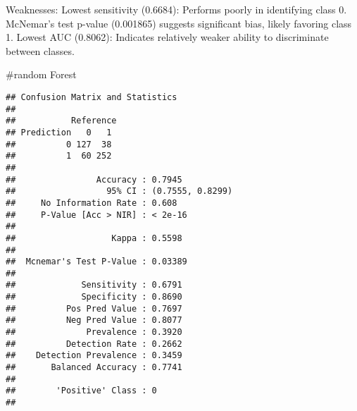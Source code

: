 \documentclass[
]{article}
\newenvironment{Shaded}{\begin{snugshade}}{\end{snugshade}}
\newcommand{\AttributeTok}[1]{\textcolor[rgb]{0.13,0.29,0.53}{#1}}
\newcommand{\CommentTok}[1]{\textcolor[rgb]{0.56,0.35,0.01}{\textit{#1}}}
\newcommand{\DecValTok}[1]{\textcolor[rgb]{0.00,0.00,0.81}{#1}}
\newcommand{\FloatTok}[1]{\textcolor[rgb]{0.00,0.00,0.81}{#1}}
\newcommand{\FunctionTok}[1]{\textcolor[rgb]{0.13,0.29,0.53}{\textbf{#1}}}
\newcommand{\NormalTok}[1]{#1}
\newcommand{\OtherTok}[1]{\textcolor[rgb]{0.56,0.35,0.01}{#1}}
\newcommand{\SpecialCharTok}[1]{\textcolor[rgb]{0.81,0.36,0.00}{\textbf{#1}}}
\newcommand{\StringTok}[1]{\textcolor[rgb]{0.31,0.60,0.02}{#1}}
\begin{document}
Weaknesses: Lowest sensitivity (0.6684): Performs poorly in identifying
class 0. McNemar's test p-value (0.001865) suggests significant bias,
likely favoring class 1. Lowest AUC (0.8062): Indicates relatively
weaker ability to discriminate between classes.

\#random Forest

\begin{Shaded}
\end{Shaded}

\begin{verbatim}
## Confusion Matrix and Statistics
## 
##           Reference
## Prediction   0   1
##          0 127  38
##          1  60 252
##                                           
##                Accuracy : 0.7945          
##                  95% CI : (0.7555, 0.8299)
##     No Information Rate : 0.608           
##     P-Value [Acc > NIR] : < 2e-16         
##                                           
##                   Kappa : 0.5598          
##                                           
##  Mcnemar's Test P-Value : 0.03389         
##                                           
##             Sensitivity : 0.6791          
##             Specificity : 0.8690          
##          Pos Pred Value : 0.7697          
##          Neg Pred Value : 0.8077          
##              Prevalence : 0.3920          
##          Detection Rate : 0.2662          
##    Detection Prevalence : 0.3459          
##       Balanced Accuracy : 0.7741          
##                                           
##        'Positive' Class : 0               
## 
\end{verbatim}

\begin{Shaded}
\end{Shaded}
\end{document}
